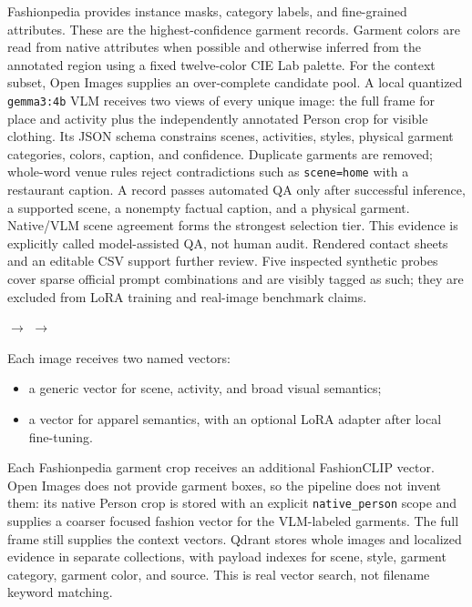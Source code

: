 \documentclass[11pt]{article}
\newcommand{\pill}[1]{\fcolorbox{ink}{soft}{\strut\footnotesize\texttt{#1}}}
\begin{document}
Fashionpedia provides instance masks, category labels, and fine-grained attributes. These are the highest-confidence garment records. Garment colors are read from native attributes when possible and otherwise inferred from the annotated region using a fixed twelve-color CIE Lab palette. For the context subset, Open Images supplies an over-complete candidate pool. A local quantized \texttt{gemma3:4b} VLM receives two views of every unique image: the full frame for place and activity plus the independently annotated Person crop for visible clothing. Its JSON schema constrains scenes, activities, styles, physical garment categories, colors, caption, and confidence. Duplicate garments are removed; whole-word venue rules reject contradictions such as \texttt{scene=home} with a restaurant caption. A record passes automated QA only after successful inference, a supported scene, a nonempty factual caption, and a physical garment. Native/VLM scene agreement forms the strongest selection tier. This evidence is explicitly called model-assisted QA, not human audit. Rendered contact sheets and an editable CSV support further review. Five inspected synthetic probes cover sparse official prompt combinations and are visibly tagged as such; they are excluded from LoRA training and real-image benchmark claims.

\begin{center}
\small
{}\quad
$\longrightarrow$\quad
{}\quad
$\longrightarrow$\quad
{}
\end{center}

Each image receives two named vectors:

\begin{itemize}
  \item a generic \pill{CLIP} vector for scene, activity, and broad visual semantics;
  \item a \pill{Marqo FashionCLIP} vector for apparel semantics, with an optional LoRA adapter after local fine-tuning.
\end{itemize}

Each Fashionpedia garment crop receives an additional FashionCLIP vector. Open Images does not provide garment boxes, so the pipeline does not invent them: its native Person crop is stored with an explicit \texttt{native\_person} scope and supplies a coarser focused fashion vector for the VLM-labeled garments. The full frame still supplies the context vectors. Qdrant stores whole images and localized evidence in separate collections, with payload indexes for scene, style, garment category, garment color, and source. This is real vector search, not filename keyword matching.
\end{document}
